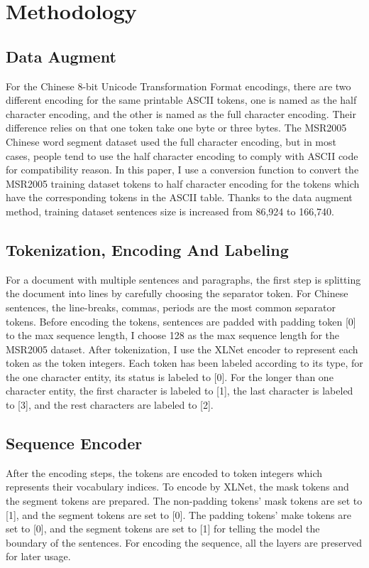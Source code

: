 \documentclass[11pt,a4paper]{article}
\begin{document}
\section{Methodology}
\label{sec:hireachy}

\subsection{Data Augment}

For the Chinese 8-bit Unicode Transformation Format encodings, there are two different encoding for the same printable ASCII tokens, one is named as the half character encoding,
and the other is named as the full character encoding.
Their difference relies on that one token take one byte or three bytes. The MSR2005 Chinese word segment dataset used the full character encoding, but in most cases,
people tend to use the half character encoding to comply with ASCII code for compatibility reason.
In this paper, I use a conversion function to convert the MSR2005 training dataset tokens to half character encoding for the tokens which have the corresponding tokens in the ASCII table.
Thanks to the data augment method, training dataset sentences size is increased from 86,924 to 166,740.

\subsection{Tokenization, Encoding And Labeling}

For a document with multiple sentences and paragraphs, the first step is splitting the document into lines by carefully choosing the separator token.
For Chinese sentences, the line-breaks, commas, periods are the most common separator tokens.
Before encoding the tokens, sentences are padded with padding token [0] to the max sequence length, I choose 128 as the max sequence length for the MSR2005 dataset.
After tokenization, I use the XLNet encoder to represent each token as the token integers.
Each token has been labeled according to its type, for the one character entity, its status is labeled to [0].
For the longer than one character entity, the first character is labeled to [1], the last character is labeled to [3], and the rest characters are labeled to [2].

\subsection{Sequence Encoder}

After the encoding steps, the tokens are encoded to token integers which represents their vocabulary indices.
To encode by XLNet, the mask tokens and the segment tokens are prepared.
The non-padding tokens' mask tokens are set to [1], and the segment tokens are set to [0].
The padding tokens' make tokens are set to [0], and the segment tokens are set to [1] for telling the model the boundary of the sentences.
For encoding the sequence, all the layers are preserved for later usage.
\end{document}
